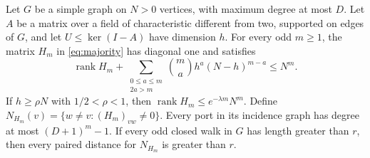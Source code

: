 \begin{theorem}\label{thm:majority}
Let $G$ be a simple graph on $N>0$ vertices, with maximum degree at
most $D$. Let $A$ be a matrix over a field of characteristic different
from two, supported on edges of $G$, and let $U\le\ker(I-A)$ have
dimension $h$. For every odd $m\ge1$, the matrix $H_m$ in
\cref{eq:majority} has diagonal one and satisfies
\begin{equation}\label{eq:exact-rank}
 \operatorname{rank}H_m+
 \sum_{\substack{0\le a\le m\\2a>m}}\binom ma h^a(N-h)^{m-a}\le N^m.
\end{equation}
If $h\ge\rho N$ with $1/2<\rho<1$, then
$\operatorname{rank}H_m\le e^{-\lambda m}N^m$.
Define $N_{H_m}(v)=\{w\ne v:(H_m)_{vw}\ne0\}$.
Every port in its incidence graph has degree at most $(D+1)^m-1$.
If every odd closed walk in $G$ has length greater than $r$, then
every paired distance for $N_{H_m}$ is greater than $r$.
\end{theorem}
